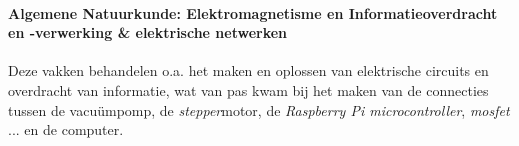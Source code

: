 \documentclass[a4paper,twoside,kulak]{kulakreport} %
\begin{document}
\paragraph{Algemene Natuurkunde: Elektromagnetisme en Informatieoverdracht en -verwerking \& elektrische netwerken}

Deze vakken behandelen o.a. het maken en oplossen van elektrische circuits en overdracht van informatie, wat van pas kwam bij het maken van de connecties tussen de vacuümpomp, de \textit{stepper}motor, de \textit{Raspberry Pi microcontroller}, \textit{mosfet} ... en de computer.

 
\end{document}
